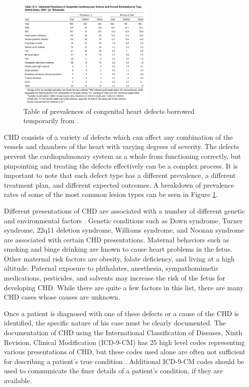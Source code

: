 \begin{figure}
\centering
\includegraphics[width=0.6\textwidth]{5/chd-defects-usa.png}
\caption{Table of prevalences of congenital heart defects borrowed temporarily from \cite{Mozaffarian2016}.}
\label{ch5:fig:usa-defects-prev}
\end{figure}

CHD consists of a variety of defects which can affect any combination of the vessels and chambers of the heart with varying degrees of severity. The defects prevent the cardiopulmonary system as a whole from functioning correctly, but pinpointing and treating the defects effectively can be a complex process. It is important to note that each defect type has a different prevalence, a different treatment plan, and different expected outcomes. A breakdown of prevalence rates of some of the most common lesion types can be seen in Figure \ref{ch5:fig:usa-defects-prev}. %

Different presentations of CHD are associated with a number of different genetic and environmental factors \cite{Mozaffarian2016}. Genetic conditions such as Down syndrome, Turner syndrome, 22q11 deletion syndrome, Williams syndrome, and Noonan syndrome are associated with certain CHD presentations. Maternal behaviors such as smoking and binge drinking are known to cause heart problems in the fetus. Other maternal risk factors are obesity, folate deficiency, and living at a high altitude. Paternal exposure to phthalates, anesthesia, sympathomimetic medications, pesticides, and solvents may increase the risk of the fetus for developing CHD. While there are quite a few factors in this list, there are many CHD cases whose causes are unknown.

Once a patient is diagnosed with one of these defects or a cause of the CHD is identified, the specific nature of his case must be clearly documented. The documentation of CHD using the International Classification of Diseases, Ninth Revision, Clinical Modification (ICD-9-CM) has 25 high level codes representing various presentations of CHD, but these codes used alone are often not sufficient for describing a patient's true condition \cite{Mozaffarian2016}. Additional ICD-9-CM codes should be used to communicate the finer details of a patient's condition, if they are available. %

